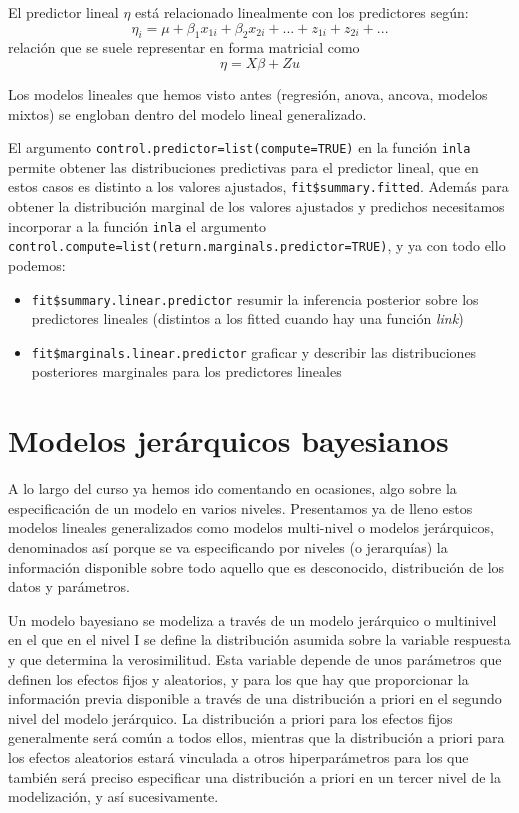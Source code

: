 \documentclass[
]{book}
\providecommand{\tightlist}{%
  \setlength{\itemsep}{0pt}\setlength{\parskip}{0pt}}
\begin{document}
El predictor lineal \(\eta\) está relacionado linealmente con los predictores según:
\[\eta_i=\mu + \beta_1 x_{1i} +   \beta_2 x_{2i} +...+ z_{1i} + z_{2i}+...\]
relación que se suele representar en forma matricial como
\[\eta=X\beta + Z u\]

Los modelos lineales que hemos visto antes (regresión, anova, ancova, modelos mixtos) se engloban dentro del modelo lineal generalizado.

El argumento \texttt{control.predictor=list(compute=TRUE)} en la función \texttt{inla} permite obtener las distribuciones predictivas para el predictor lineal, que en estos casos es distinto a los valores ajustados, \texttt{fit\$summary.fitted}. Además para obtener la distribución marginal de los valores ajustados y predichos necesitamos incorporar a la función \texttt{inla} el argumento \texttt{control.compute=list(return.marginals.predictor=TRUE)}, y ya con todo ello podemos:

\begin{itemize}
\tightlist
\item
  \texttt{fit\$summary.linear.predictor} resumir la inferencia posterior sobre los
  predictores lineales (distintos a los fitted cuando hay una función \emph{link})
\item
  \texttt{fit\$marginals.linear.predictor} graficar y describir las distribuciones posteriores marginales para los predictores lineales
\end{itemize}

\hypertarget{modelos-jeruxe1rquicos-bayesianos}{%
\section{Modelos jerárquicos bayesianos}\label{modelos-jeruxe1rquicos-bayesianos}}

A lo largo del curso ya hemos ido comentando en ocasiones, algo sobre la especificación de un modelo en varios niveles. Presentamos ya de lleno estos modelos lineales generalizados como modelos multi-nivel o modelos jerárquicos, denominados así porque se va especificando por niveles (o jerarquías) la información disponible sobre todo aquello que es desconocido, distribución de los datos y parámetros.

Un modelo bayesiano se modeliza a través de un modelo jerárquico o multinivel en el que en el nivel I se define la distribución asumida sobre la variable respuesta y que determina la verosimilitud. Esta variable depende de unos parámetros que definen los efectos fijos y aleatorios, y para los que hay que proporcionar la información previa disponible a través de una distribución a priori en el segundo nivel del modelo jerárquico. La distribución a priori para los efectos fijos generalmente será común a todos ellos, mientras que la distribución a priori para los efectos aleatorios estará vinculada a otros hiperparámetros para los que también será preciso especificar una distribución a priori en un tercer nivel de la modelización, y así sucesivamente.
\end{document}
